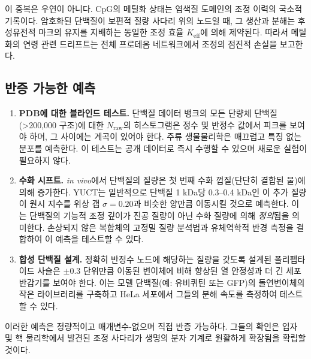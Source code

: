 \documentclass[12pt,a4paper]{article}
\begin{document}
	이 중복은 우연이 아니다. CpG의 메틸화 상태는 염색질 도메인의 조정 이력의 국소적 기록이다. 암호화된 단백질이 보편적 질량 사다리 위의 노드일 때, 그 생산과 분해는 후성유전적 마크의 유지를 지배하는 동일한 조정 효율 \(K_{\mathrm{eff}}\)에 의해 제약된다. 따라서 메틸화의 연령 관련 드리프트는 전체 프로테옴 네트워크에서 조정의 점진적 손실을 보고한다.
	
	\subsection{반증 가능한 예측}
	\begin{enumerate}
		\item \textbf{PDB에 대한 블라인드 테스트.} 단백질 데이터 뱅크의 모든 단량체 단백질(>200,000 구조)에 대한 \(N_{\mathrm{raw}}\)의 히스토그램은 정수 및 반정수 값에서 피크를 보여야 하며, 그 사이에는 계곡이 있어야 한다. 주류 생물물리학은 매끄럽고 특징 없는 분포를 예측한다. 이 테스트는 공개 데이터로 즉시 수행할 수 있으며 새로운 실험이 필요하지 않다.
		\item \textbf{수화 시프트.} \textit{in vivo}에서 단백질의 질량은 첫 번째 수화 껍질(단단히 결합된 물)에 의해 증가한다. YUCT는 일반적으로 단백질 1 kDa당 0.3–0.4 kDa인 이 추가 질량이 원시 지수를 위상 갭 \(\sigma = 0.20\)과 비슷한 양만큼 이동시킬 것으로 예측한다. 이는 단백질의 기능적 조정 깊이가 진공 질량이 아닌 수화 질량에 의해 \emph{정의}됨을 의미한다. 손상되지 않은 복합체의 고정밀 질량 분석법과 유체역학적 반경 측정을 결합하여 이 예측을 테스트할 수 있다.
		\item \textbf{합성 단백질 설계.} 정확히 반정수 노드에 해당하는 질량을 갖도록 설계된 폴리펩타이드 사슬은 \(\pm 0.3\) 단위만큼 이동된 변이체에 비해 향상된 열 안정성과 더 긴 세포 반감기를 보여야 한다. 이는 모델 단백질(예: 유비퀴틴 또는 GFP)의 돌연변이체의 작은 라이브러리를 구축하고 HeLa 세포에서 그들의 분해 속도를 측정하여 테스트할 수 있다.
	\end{enumerate}
	
	이러한 예측은 정량적이고 매개변수-없으며 직접 반증 가능하다. 그들의 확인은 입자 및 핵 물리학에서 발견된 조정 사다리가 생명의 분자 기계로 원활하게 확장됨을 확립할 것이다.
	
\end{document}
